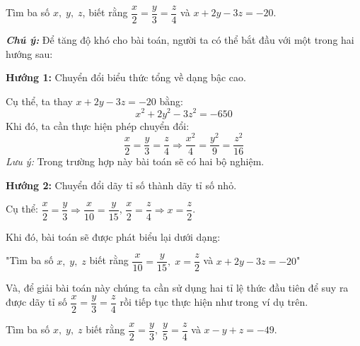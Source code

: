 \begin{vd}%
	Tìm ba số $x, \; y, \; z$, biết rằng $\dfrac{x}{2} = \dfrac{y}{3} = \dfrac{z}{4}$ và $x+2y-3z = - 20$.
\end{vd}

\begin{note}
	\textbf{\textit{Chú ý:}} Để tăng độ khó cho bài toán, người ta có thể bắt đầu với một trong hai hướng sau:
	
	\textbf{Hướng 1:} Chuyển đổi biểu thức tổng về dạng bậc cao.
	
	Cụ thể, ta thay $x+2y-3z=-20$ bằng:
	\[x^2+2y^2-3z^2 = -650 \]
	Khi đó, ta cần thực hiện phép chuyển đổi:
	\[\dfrac{x}{2} = \dfrac{y}{3} = \dfrac{z}{4} \Rightarrow \dfrac{x^2}{4} = \dfrac{y^2}{9} = \dfrac{z^2}{16} \]
	\textit{Lưu ý:} Trong trường hợp này bài toán sẽ có hai bộ nghiệm.
	
	\textbf{Hướng 2:} Chuyển đổi dãy tỉ số thành dãy tỉ số nhỏ.
	
	Cụ thể: $\dfrac{x}{2} = \dfrac{y}{3} \Rightarrow \dfrac{x}{10} = \dfrac{y}{15}$, $\dfrac{x}{2} = \dfrac{z}{4} \Rightarrow x = \dfrac{z}{2}$.
	
	Khi đó, bài toán sẽ được phát biểu lại dưới dạng:
	\begin{center}
		"Tìm ba số $x, \; y, \; z$ biết rằng $\dfrac{x}{10} = \dfrac{y}{15}, \; x = \dfrac{z}{2}$ và $x+2y-3z=-20$"
	\end{center}
	Và, để giải bài toán này chúng ta cần sử dụng hai tỉ lệ thức đầu tiên để suy ra được dãy tỉ số $\dfrac{x}{2} = \dfrac{y}{3} = \dfrac{z}{4}$ rồi tiếp tục thực hiện như trong ví dụ trên.
\end{note}

\begin{vd}%
	Tìm ba số $x, \; y, \; z$ biết rằng $\dfrac{x}{2} = \dfrac{y}{3}, \; \dfrac{y}{5} = \dfrac{z}{4}$ và $x-y+z=-49$.
\end{vd}

